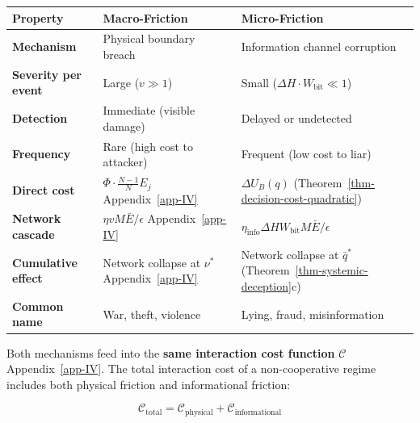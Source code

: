 \documentclass[11pt]{article}
\theoremstyle{plain}
\theoremstyle{definition}
\theoremstyle{remark}
\newcounter{none}
\begin{document}
{\def\LTcaptype{none} %
\begin{longtable}[]{@{}
  >{\raggedright\arraybackslash}p{}
  >{\raggedright\arraybackslash}p{}
  >{\raggedright\arraybackslash}p{}@{}}
\toprule\noalign{}
\begin{minipage}[b]{\linewidth}\raggedright
Property
\end{minipage} & \begin{minipage}[b]{\linewidth}\raggedright
Macro-Friction
\end{minipage} & \begin{minipage}[b]{\linewidth}\raggedright
Micro-Friction
\end{minipage} \\
\midrule\noalign{}
\endhead
\bottomrule\noalign{}
\endlastfoot
\textbf{Mechanism} & Physical boundary breach & Information channel
corruption \\
\textbf{Severity per event} & Large (\(v \gg 1\)) & Small
(\(\Delta H \cdot W_{\text{bit}} \ll 1\)) \\
\textbf{Detection} & Immediate (visible damage) & Delayed or
undetected \\
\textbf{Frequency} & Rare (high cost to attacker) & Frequent (low cost
to liar) \\
\textbf{Direct cost} & \(\Phi \cdot \frac{N-1}{N} E_j\)
Appendix~\ref{app-IV} & \(\Delta U_B(q)\)
(Theorem~\ref{thm-decision-cost-quadratic}) \\
\textbf{Network cascade} & \(\eta v M \bar{E} / \epsilon\)
Appendix~\ref{app-IV} &
\(\eta_{\text{info}} \Delta H W_{\text{bit}} M \bar{E} / \epsilon\) \\
\textbf{Cumulative effect} & Network collapse at \(\nu^*\)
Appendix~\ref{app-IV} & Network collapse at \(\bar{q}^*\)
(Theorem~\ref{thm-systemic-deception}c) \\
\textbf{Common name} & War, theft, violence & Lying, fraud,
misinformation \\
\end{longtable}
}

Both mechanisms feed into the \textbf{same interaction cost function}
\(\mathcal{C}\) Appendix~\ref{app-IV}. The total interaction cost of a
non-cooperative regime includes both physical friction and informational
friction:

\[\mathcal{C}_{\text{total}} = \mathcal{C}_{\text{physical}} + \mathcal{C}_{\text{informational}}\]
\end{document}

